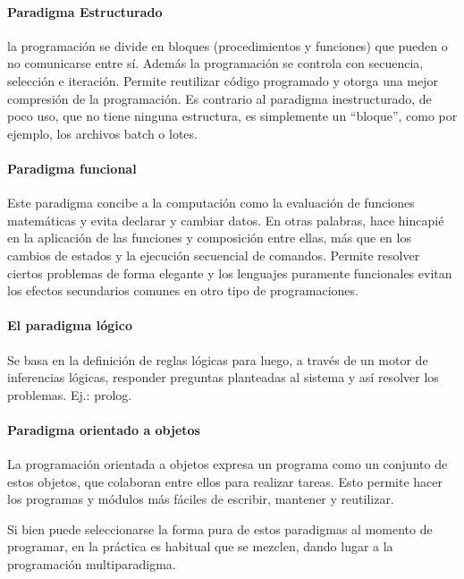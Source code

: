 \documentclass[12pt,legalpaper]{report}
\begin{document}
					\paragraph{Paradigma Estructurado}

la programación se divide en bloques (procedimientos y funciones) que pueden o no comunicarse entre sí. Además la programación se controla con secuencia, selección e iteración. Permite reutilizar código programado y otorga una mejor compresión de la programación. Es contrario al paradigma inestructurado, de poco uso, que no tiene ninguna estructura, es simplemente un “bloque”, como por ejemplo, los archivos batch o lotes.
				
					\paragraph{Paradigma funcional}
				 
Este paradigma concibe a la computación como la evaluación de funciones matemáticas y evita declarar y cambiar datos. En otras palabras, hace hincapié en la aplicación de las funciones y composición entre ellas, más que en los cambios de estados y la ejecución secuencial de comandos. Permite resolver ciertos problemas de forma elegante y los lenguajes puramente funcionales evitan los efectos secundarios comunes en otro tipo de programaciones.
	
					\paragraph{El paradigma lógico}
				
Se basa en la definición de reglas lógicas para luego, a través de un motor de inferencias lógicas, responder preguntas planteadas al sistema y así resolver los problemas. Ej.: prolog.

	
					\paragraph{Paradigma orientado a objetos}
				
La programación orientada a objetos expresa un programa como un conjunto de estos objetos, que colaboran entre ellos para realizar tareas. Esto permite hacer los programas y módulos más fáciles de escribir, mantener y reutilizar.


Si bien puede seleccionarse la forma pura de estos paradigmas al momento de programar, en la práctica es habitual que se mezclen, dando lugar a la programación multiparadigma.
\end{document}
